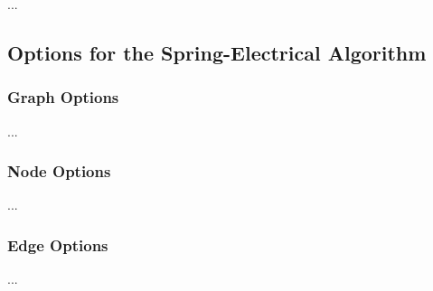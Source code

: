 ...

\subsection{Options for the Spring-Electrical Algorithm}

\subsubsection{Graph Options}

...

\subsubsection{Node Options}

...

\subsubsection{Edge Options}

...

